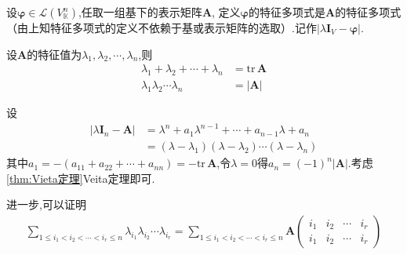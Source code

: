 \begin{formal}
\begin{definition}[线性变换的特征多项式]\label{def:线性变换的特征多项式}
    设$\bm{\varphi}\in\mathcal{L}\left(
        V_{\mathbb{K}}^n
    \right)$,任取一组基下的表示矩阵$\bm{A}$,
    定义$\bm{\varphi}$的特征多项式是$\bm{A}$的特征多项式（由上知特征多项式的定义不依赖于基或表示矩阵的选取）.记作$\left|
        \lambda\bm{I}_V-\bm{\varphi}
    \right|$.
\end{definition}
\end{formal}
\begin{green}
\begin{lemma}[特征值的和与积]\label{lem:特征值的和与积}
    设$\bm{A}$的特征值为$\lambda_1,\lambda_2,\cdots,\lambda_n$,则
    \begin{align*}
        \lambda_1+\lambda_2+\cdots+\lambda_n&=\mathrm{tr}\,\bm{A}\\
        \lambda_1\lambda_2\cdots\lambda_n&=\left|\bm{A}\right|
    \end{align*}
\end{lemma}
\begin{Proof}
设\begin{align*}
    \left|\lambda\bm{I}_n-\bm{A}\right|&=
    \lambda^n+a_1\lambda^{n-1}+\cdots+a_{n-1}\lambda+a_n\\
    &=\left(
        \lambda-\lambda_1
    \right)\left(
        \lambda-\lambda_2
    \right)\cdots\left(
        \lambda-\lambda_n
    \right)
\end{align*}
其中$a_1=
-\left(
    a_{11}+a_{22}+\cdots+a_{nn}
\right)=-\mathrm{tr}\,\bm{A}$,令$\lambda = 0$得$
a_n=\left(-1\right)^n\left|\bm{A}\right|
$.考虑\cref{thm:Vieta定理}Veita定理即可.
\end{Proof}
\end{green}
\begin{green}
\begin{corollary}[$r$阶主子式之和]\label{cor:r阶主子式之和}
    进一步,可以证明
\begin{align*}
    \sum_{1\leqslant i_1<i_2<\cdots<i_r\leqslant n}\lambda_{i_1}\lambda_{i_2}\cdots\lambda_{i_r}=
    \sum_{1\leqslant i_1<i_2<\cdots<i_r\leqslant n} \bm{A}\begin{pmatrix}
        i_1&i_2&\cdots&i_r\\
        i_1&i_2&\cdots&i_r
    \end{pmatrix}
\end{align*}
\end{corollary}
\end{green}
